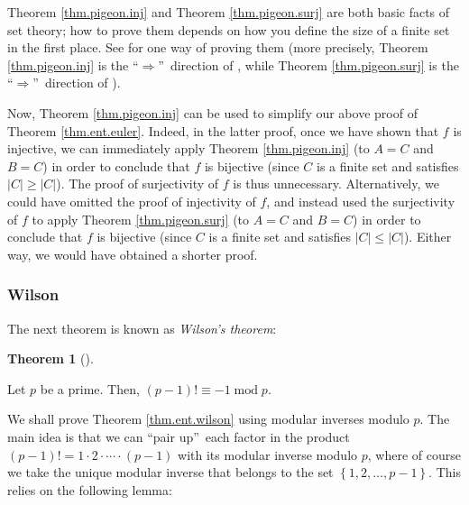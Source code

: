 \documentclass[numbers=enddot,12pt,final,onecolumn,notitlepage]{scrartcl}%
\numberwithin{exer}{subsection}
\theoremstyle{definition}
\newtheorem{theo}{Theorem}[subsection]
\newenvironment{theorem}[1][]
{\begin{theo}[#1]\begin{leftbar}}
{\end{leftbar}\end{theo}}
\begin{document}
Theorem \ref{thm.pigeon.inj} and Theorem \ref{thm.pigeon.surj} are both basic
facts of set theory; how to prove them depends on how you define the size of a
finite set in the first place. See \cite[solution to Exercise 1.1]{detnotes}
for one way of proving them (more precisely, Theorem \ref{thm.pigeon.inj} is
the \textquotedblleft$\Longrightarrow$\textquotedblright\ direction of
\cite[Lemma 1.5]{detnotes}, while Theorem \ref{thm.pigeon.surj} is the
\textquotedblleft$\Longrightarrow$\textquotedblright\ direction of \cite[Lemma
1.4]{detnotes}).

Now, Theorem \ref{thm.pigeon.inj} can be used to simplify our above proof of
Theorem \ref{thm.ent.euler}. Indeed, in the latter proof, once we have shown
that $f$ is injective, we can immediately apply Theorem \ref{thm.pigeon.inj}
(to $A=C$ and $B=C$) in order to conclude that $f$ is bijective (since $C$ is
a finite set and satisfies $\left\vert C\right\vert \geq\left\vert
C\right\vert $). The proof of surjectivity of $f$ is thus unnecessary.
Alternatively, we could have omitted the proof of injectivity of $f$, and
instead used the surjectivity of $f$ to apply Theorem \ref{thm.pigeon.surj}
(to $A=C$ and $B=C$) in order to conclude that $f$ is bijective (since $C$ is
a finite set and satisfies $\left\vert C\right\vert \leq\left\vert
C\right\vert $). Either way, we would have obtained a shorter proof.

\subsubsection{Wilson}

The next theorem is known as \textit{Wilson's theorem}:

\begin{theorem}
\label{thm.ent.wilson}Let $p$ be a prime. Then, $\left(  p-1\right)
!\equiv-1\operatorname{mod}p$.
\end{theorem}

We shall prove Theorem \ref{thm.ent.wilson} using modular inverses modulo $p$.
The main idea is that we can \textquotedblleft pair up\textquotedblright\ each
factor in the product $\left(  p-1\right)  !=1\cdot2\cdot\cdots\cdot\left(
p-1\right)  $ with its modular inverse modulo $p$, where of course we take the
unique modular inverse that belongs to the set $\left\{  1,2,\ldots
,p-1\right\}  $. This relies on the following lemma:
\end{document}
